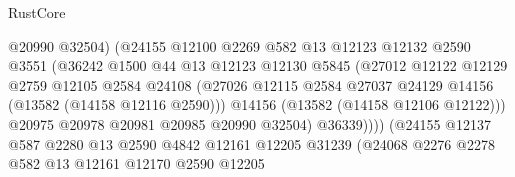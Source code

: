 \begin{lexlean}{RustCore}
\begin{coremodule}
                                    @20990
                                    @32504)
                                  (@24155
                                    @12100
                                    @2269
                                    @582
                                    @13
                                    @12123
                                    @12132
                                    @2590
                                    @3551
                                    (@36242
                                      @1500
                                      @44
                                      @13
                                      @12123
                                      @12130
                                      @5845
                                      (@27012
                                        @12122
                                        @12129
                                        @2759
                                        @12105
                                        @2584
                                        @24108
                                        (@27026
                                          @12115
                                          @2584
                                          @27037
                                          @24129
                                          @14156
                                          (@13582 (@14158 @12116 @2590)))
                                        @14156
                                        (@13582 (@14158 @12106 @12122)))
                                      @20975
                                      @20978
                                      @20981
                                      @20985
                                      @20990
                                      @32504)
                                    @36339))))
                            (@24155
                              @12137
                              @587
                              @2280
                              @13
                              @2590
                              @4842
                              @12161
                              @12205
                              @31239
                              (@24068
                                @2276
                                @2278
                                @582
                                @13
                                @12161
                                @12170
                                @2590
                                @12205

\end{coremodule}
\end{lexlean}

